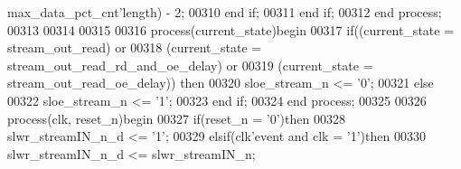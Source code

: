 \begin{DoxyCode}
{      max_data_pct_cnt}\textcolor{vhdlchar}{'}\textcolor{vhdlkeyword}{length}\textcolor{vhdlchar}{)} \textcolor{vhdlchar}{-} \textcolor{vhdllogic}{}\textcolor{vhdllogic}{2};
00310         \textcolor{keywordflow}{end} \textcolor{keywordflow}{if};
00311     \textcolor{keywordflow}{end} \textcolor{keywordflow}{if}; 
00312 \textcolor{keywordflow}{end} \textcolor{keywordflow}{process};
00313 
00314 
00315 
00316 \textcolor{keywordflow}{process}(current_state)\textcolor{keywordflow}{begin}
00317     \textcolor{keywordflow}{if}\textcolor{vhdlchar}{(}\textcolor{vhdlchar}{(}\textcolor{vhdlchar}{current_state} \textcolor{vhdlchar}{=} \textcolor{vhdlchar}{stream\_out\_read}\textcolor{vhdlchar}{)} \textcolor{keywordflow}{or} 
00318         \textcolor{vhdlchar}{(}\textcolor{vhdlchar}{current_state} \textcolor{vhdlchar}{=} \textcolor{vhdlchar}{stream\_out\_read\_rd\_and\_oe\_delay}\textcolor{vhdlchar}{)} \textcolor{keywordflow}{or} 
00319         \textcolor{vhdlchar}{(}\textcolor{vhdlchar}{current_state} \textcolor{vhdlchar}{=} \textcolor{vhdlchar}{stream\_out\_read\_oe\_delay}\textcolor{vhdlchar}{)}\textcolor{vhdlchar}{)} \textcolor{keywordflow}{then}        
00320         \textcolor{vhdlchar}{sloe_stream_n} \textcolor{vhdlchar}{<=} \textcolor{vhdlchar}{'}\textcolor{vhdllogic}{}\textcolor{vhdllogic}{0}\textcolor{vhdlchar}{'};
00321     \textcolor{keywordflow}{else}
00322         \textcolor{vhdlchar}{sloe_stream_n} \textcolor{vhdlchar}{<=} \textcolor{vhdlchar}{'}\textcolor{vhdllogic}{}\textcolor{vhdllogic}{1}\textcolor{vhdlchar}{'};
00323     \textcolor{keywordflow}{end} \textcolor{keywordflow}{if};
00324 \textcolor{keywordflow}{end} \textcolor{keywordflow}{process};
00325 
00326 \textcolor{keywordflow}{process}(clk, reset_n)\textcolor{keywordflow}{begin}
00327     \textcolor{keywordflow}{if}\textcolor{vhdlchar}{(}\textcolor{vhdlchar}{reset_n} \textcolor{vhdlchar}{=} \textcolor{vhdlchar}{'}\textcolor{vhdllogic}{}\textcolor{vhdllogic}{0}\textcolor{vhdlchar}{'}\textcolor{vhdlchar}{)}\textcolor{keywordflow}{then}
00328         \textcolor{vhdlchar}{slwr_streamIN_n_d} \textcolor{vhdlchar}{<=} \textcolor{vhdlchar}{'}\textcolor{vhdllogic}{}\textcolor{vhdllogic}{1}\textcolor{vhdlchar}{'};
00329     \textcolor{keywordflow}{elsif}\textcolor{vhdlchar}{(}\textcolor{vhdlchar}{clk}\textcolor{vhdlchar}{'}\textcolor{vhdlkeyword}{event} \textcolor{keywordflow}{and} \textcolor{vhdlchar}{clk} \textcolor{vhdlchar}{=} \textcolor{vhdlchar}{'}\textcolor{vhdllogic}{}\textcolor{vhdllogic}{1}\textcolor{vhdlchar}{'}\textcolor{vhdlchar}{)}\textcolor{keywordflow}{then}
00330         \textcolor{vhdlchar}{slwr_streamIN_n_d} \textcolor{vhdlchar}{<=} \textcolor{vhdlchar}{slwr_streamIN_n};

\end{DoxyCode}
